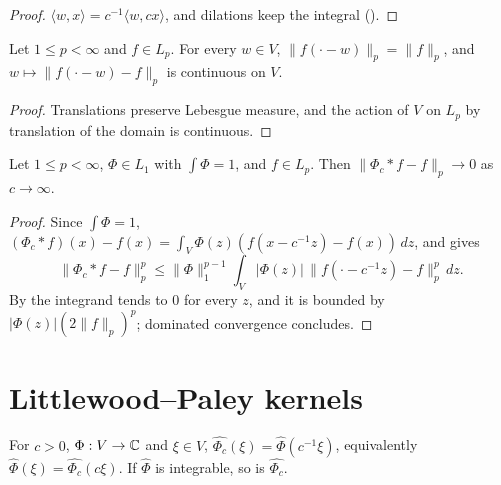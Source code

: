 \begin{proof}
\leanok
$\langle w, x \rangle = c^{-1} \langle w, c x \rangle$, and dilations keep the integral
().
\end{proof}

\begin{lemma}
\label{lem:translation-continuity}
\leanok
Let $1 \leq p < \infty$ and $f \in L_p$. For every $w \in V$, $\|f(\cdot - w)\|_p = \|f\|_p$,
and $w \mapsto \|f(\cdot - w) - f\|_p$ is continuous on $V$.
\end{lemma}

\begin{proof}
\leanok
Translations preserve Lebesgue measure, and the action of $V$ on $L_p$ by translation of the
domain is continuous.
\end{proof}

\begin{theorem}
\label{thm:approx-identity}
\leanok
{}
Let $1 \leq p < \infty$, $\Phi \in L_1$ with $\int \Phi = 1$, and $f \in L_p$. Then
$\|\Phi_c * f - f\|_p \to 0$ as $c \to \infty$.
\end{theorem}

\begin{proof}
\leanok
Since $\int \Phi = 1$, $(\Phi_c * f)(x) - f(x) = \int_V \Phi(z) (f(x - c^{-1} z) - f(x)) \, dz$,
and  gives
\[
  \|\Phi_c * f - f\|_p^p
  \leq \|\Phi\|_1^{p-1} \int_V |\Phi(z)| \, \|f(\cdot - c^{-1} z) - f\|_p^p \, dz .
\]
By  the integrand tends to $0$ for every $z$, and it is bounded
by $|\Phi(z)| (2 \|f\|_p)^p$; dominated convergence concludes.
\end{proof}

\section{Littlewood--Paley kernels}

\begin{lemma}
\label{lem:fourier-dilate}
\leanok
{}
For $c > 0$, $\Phi : V \to \mathbb{C}$ and $\xi \in V$, $\widehat{\Phi_c}(\xi) = \widehat\Phi(c^{-1} \xi)$,
equivalently $\widehat\Phi(\xi) = \widehat{\Phi_c}(c \xi)$.
If $\widehat\Phi$ is integrable, so is $\widehat{\Phi_c}$.
\end{lemma}

